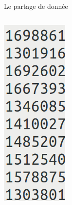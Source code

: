 \begin{frame}[fragile]{Le partage de donnée}
\begin{columns}
\includegraphics[width=1\textwidth]{slides/images/concurrence_buggy_1.png}
\end{columns}
\end{frame}

